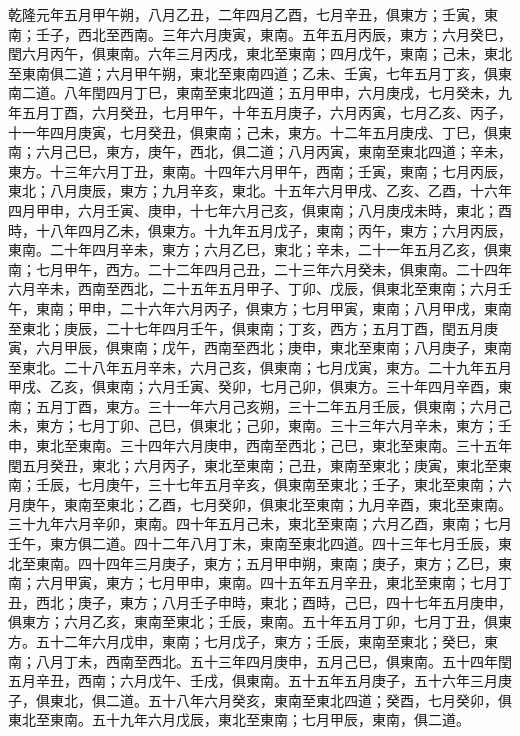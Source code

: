 \begin{pinyinscope}
乾隆元年五月甲午朔，八月乙丑，二年四月乙酉，七月辛丑，俱東方；壬寅，東南；壬子，西北至西南。三年六月庚寅，東南。五年五月丙辰，東方；六月癸巳，閏六月丙午，俱東南。六年三月丙戌，東北至東南；四月戊午，東南；己未，東北至東南俱二道；六月甲午朔，東北至東南四道；乙未、壬寅，七年五月丁亥，俱東南二道。八年閏四月丁巳，東南至東北四道；五月甲申，六月庚戌，七月癸未，九年五月丁酉，六月癸丑，七月甲午，十年五月庚子，六月丙寅，七月乙亥、丙子，十一年四月庚寅，七月癸丑，俱東南；己未，東方。十二年五月庚戌、丁巳，俱東南；六月己巳，東方，庚午，西北，俱二道；八月丙寅，東南至東北四道；辛未，東方。十三年六月丁丑，東南。十四年六月甲午，西南；壬寅，東南；七月丙辰，東北；八月庚辰，東方；九月辛亥，東北。十五年六月甲戌、乙亥、乙酉，十六年四月甲申，六月壬寅、庚申，十七年六月己亥，俱東南；八月庚戌未時，東北；酉時，十八年四月乙未，俱東方。十九年五月戊子，東南；丙午，東方；六月丙辰，東南。二十年四月辛未，東方；六月乙巳，東北；辛未，二十一年五月乙亥，俱東南；七月甲午，西方。二十二年四月己丑，二十三年六月癸未，俱東南。二十四年六月辛未，西南至西北，二十五年五月甲子、丁卯、戊辰，俱東北至東南；六月壬午，東南；甲申，二十六年六月丙子，俱東方；七月甲寅，東南；八月甲戌，東南至東北；庚辰，二十七年四月壬午，俱東南；丁亥，西方；五月丁酉，閏五月庚寅，六月甲辰，俱東南；戊午，西南至西北；庚申，東北至東南；八月庚子，東南至東北。二十八年五月辛未，六月己亥，俱東南；七月戊寅，東方。二十九年五月甲戌、乙亥，俱東南；六月壬寅、癸卯，七月己卯，俱東方。三十年四月辛酉，東南；五月丁酉，東方。三十一年六月己亥朔，三十二年五月壬辰，俱東南；六月己未，東方；七月丁卯、己巳，俱東北；己卯，東南。三十三年六月辛未，東方；壬申，東北至東南。三十四年六月庚申，西南至西北；己巳，東北至東南。三十五年閏五月癸丑，東北；六月丙子，東北至東南；己丑，東南至東北；庚寅，東北至東南；壬辰，七月庚午，三十七年五月辛亥，俱東南至東北；壬子，東北至東南；六月庚午，東南至東北；乙酉，七月癸卯，俱東北至東南；九月辛酉，東北至東南。三十九年六月辛卯，東南。四十年五月己未，東北至東南；六月乙酉，東南；七月壬午，東方俱二道。四十二年八月丁未，東南至東北四道。四十三年七月壬辰，東北至東南。四十四年三月庚子，東方；五月甲申朔，東南；庚子，東方；乙巳，東南；六月甲寅，東方；七月甲申，東南。四十五年五月辛丑，東北至東南；七月丁丑，西北；庚子，東方；八月壬子申時，東北；酉時，己巳，四十七年五月庚申，俱東方；六月乙亥，東南至東北；壬辰，東南。五十年五月丁卯，七月丁丑，俱東方。五十二年六月戊申，東南；七月戊子，東方；壬辰，東南至東北；癸巳，東南；八月丁未，西南至西北。五十三年四月庚申，五月己巳，俱東南。五十四年閏五月辛丑，西南；六月戊午、壬戌，俱東南。五十五年五月庚子，五十六年三月庚子，俱東北，俱二道。五十八年六月癸亥，東南至東北四道；癸酉，七月癸卯，俱東北至東南。五十九年六月戊辰，東北至東南；七月甲辰，東南，俱二道。


\end{pinyinscope}
